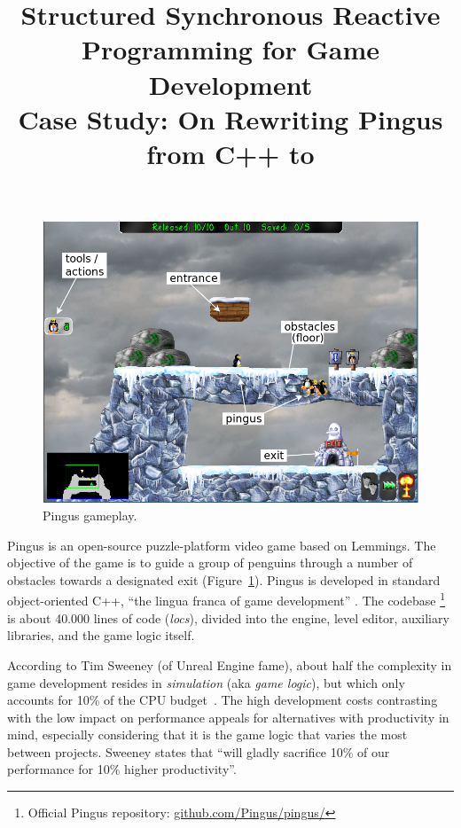 \documentclass{vgtc}                          %
\title{Structured Synchronous Reactive Programming for Game Development
        \\ \Large{Case Study: On Rewriting Pingus from C++ to \CEU}}
\newcommand{\locs}{\emph{locs}\xspace}
\begin{document}

\maketitle

\begin{figure}[t]
\centering
\includegraphics[width=\columnwidth]{pingus-annotations}
\caption{Pingus gameplay.
\label{fig.pingus}
}
\end{figure}

Pingus is an open-source puzzle-platform video game based on Lemmings.
The objective of the game is to guide a group of penguins through a number of
obstacles towards a designated exit (Figure~\ref{fig.pingus}).
%
Pingus is developed in standard object-oriented C++, ``the lingua franca of
game development'' \cite{games.patterns}.
The codebase%
\footnote{Official Pingus repository: \url{github.com/Pingus/pingus/}}
is about 40.000 lines of code (\locs), divided into
the engine, level editor, auxiliary libraries, and the game logic itself.

According to Tim Sweeney (of Unreal Engine fame), about half the complexity in
game development resides in \emph{simulation} (aka \emph{game logic}), but
which only accounts for 10\% of the CPU budget~\cite{games.sweeney}.
The high development costs contrasting with the low impact on performance
appeals for alternatives with productivity in mind, especially considering that
it is the game logic that varies the most between projects.
Sweeney states that ``will gladly sacrifice 10\% of our performance for 10\%
higher productivity''.
\end{document}
